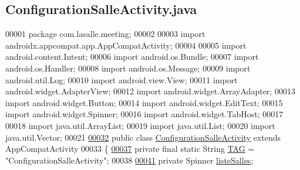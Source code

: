 \hypertarget{_configuration_salle_activity_8java_source}{}\subsection{Configuration\+Salle\+Activity.\+java}
\label{_configuration_salle_activity_8java_source}

\begin{DoxyCode}
00001 \textcolor{keyword}{package }com.lasalle.meeting;
00002 
00003 \textcolor{keyword}{import} androidx.appcompat.app.AppCompatActivity;
00004 
00005 \textcolor{keyword}{import} android.content.Intent;
00006 \textcolor{keyword}{import} android.os.Bundle;
00007 \textcolor{keyword}{import} android.os.Handler;
00008 \textcolor{keyword}{import} android.os.Message;
00009 \textcolor{keyword}{import} android.util.Log;
00010 \textcolor{keyword}{import} android.view.View;
00011 \textcolor{keyword}{import} android.widget.AdapterView;
00012 \textcolor{keyword}{import} android.widget.ArrayAdapter;
00013 \textcolor{keyword}{import} android.widget.Button;
00014 \textcolor{keyword}{import} android.widget.EditText;
00015 \textcolor{keyword}{import} android.widget.Spinner;
00016 \textcolor{keyword}{import} android.widget.TabHost;
00017 
00018 \textcolor{keyword}{import} java.util.ArrayList;
00019 \textcolor{keyword}{import} java.util.List;
00020 \textcolor{keyword}{import} java.util.Vector;
00021 
\hyperlink{classcom_1_1lasalle_1_1meeting_1_1_configuration_salle_activity}{00032} \textcolor{keyword}{public} \textcolor{keyword}{class }\hyperlink{classcom_1_1lasalle_1_1meeting_1_1_configuration_salle_activity}{ConfigurationSalleActivity} \textcolor{keyword}{extends} AppCompatActivity
00033 \{
\hyperlink{classcom_1_1lasalle_1_1meeting_1_1_configuration_salle_activity_a55224a88c619aa44eb96c0febc3f1857}{00037}     \textcolor{keyword}{private} \textcolor{keyword}{final} \textcolor{keyword}{static} String \hyperlink{classcom_1_1lasalle_1_1meeting_1_1_configuration_salle_activity_a55224a88c619aa44eb96c0febc3f1857}{TAG} = \textcolor{stringliteral}{"ConfigurationSalleActivity"}; 
00038 
\hyperlink{classcom_1_1lasalle_1_1meeting_1_1_configuration_salle_activity_ac1fa67c33882d1f181ba80a061ad097a}{00041}     \textcolor{keyword}{private} Spinner \hyperlink{classcom_1_1lasalle_1_1meeting_1_1_configuration_salle_activity_ac1fa67c33882d1f181ba80a061ad097a}{listeSalles};                    

\end{DoxyCode}
